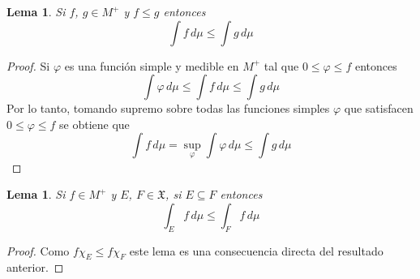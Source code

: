 \documentclass[12pt,a4paper]{article}
\theoremstyle{profesional}
\newtheorem{lemma}[teorema]{Lema}
\theoremstyle{definicion-style}
\newcommand{\X}{\mathfrak{X}}
\begin{document}
\begin{lemma}\label{lem:monotonia_integral}
    Si \( f \), \( g \in M^+ \) y \( f \leq g \) entonces \[
        \int f \, d \mu \leq \int g \, d \mu
    \]
\end{lemma}
\begin{proof}
    Si \( \varphi \) es una función simple y medible en \( M^+ \) tal que \( 0 \leq \varphi \leq f \) entonces
    \[
        \int \varphi \, d \mu \leq \int f \, d \mu \leq \int g \, d \mu
    \]
    Por lo tanto, tomando supremo sobre todas las funciones simples \( \varphi \) que satisfacen \( 0 \leq \varphi \leq f \) se obtiene que \[
        \int f \, d \mu = \sup_{\varphi} \int \varphi \, d \mu \leq \int g \, d \mu
    \]
\end{proof}

\begin{lemma}\label{lem:integral_subconjunto}
    Si \( f \in M^+ \) y \( E \), \( F \in \X \), si \( E \subseteq F \) entonces \[
        \int_E f \, d \mu \leq \int_F f \, d \mu
    \]
\end{lemma}
\begin{proof}
    Como \( f \chi_E \leq f \chi_F \) este lema es una consecuencia directa del resultado anterior.
\end{proof}
\end{document}
